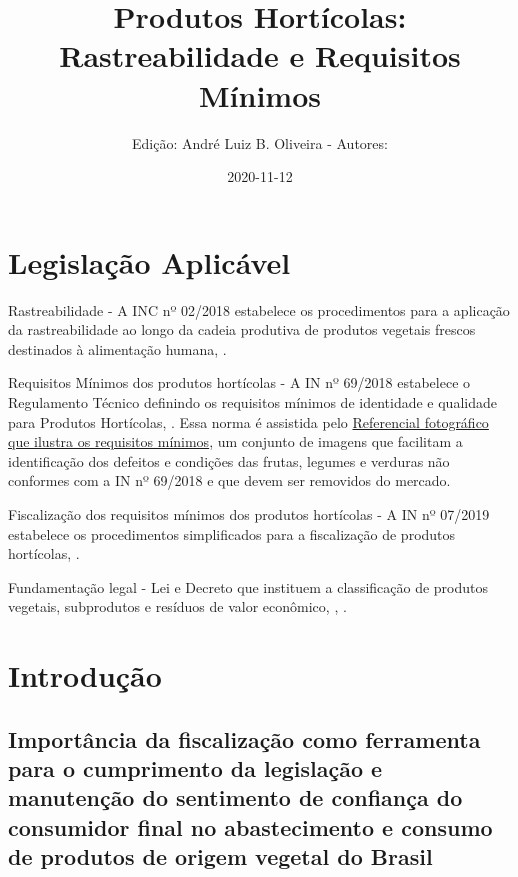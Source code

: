 \documentclass[
]{book}
\title{Produtos Hortícolas: Rastreabilidade e Requisitos Mínimos}
\author{Edição: André Luiz B. Oliveira - Autores:}
\date{2020-11-12}
\begin{document}
\maketitle

{
\setcounter{tocdepth}{1}
\tableofcontents
}
\hypertarget{legislauxe7uxe3o-aplicuxe1vel}{%
\chapter{Legislação Aplicável}\label{legislauxe7uxe3o-aplicuxe1vel}}

Rastreabilidade - A INC nº 02/2018 estabelece os procedimentos para a aplicação da rastreabilidade ao longo da cadeia produtiva de produtos vegetais frescos destinados à alimentação humana, \citep{INC}.

Requisitos Mínimos dos produtos hortícolas - A IN nº 69/2018 estabelece o Regulamento Técnico definindo os requisitos mínimos de identidade e qualidade para Produtos Hortícolas, \citep{REQ}. Essa norma é assistida pelo \href{https://www.gov.br/agricultura/pt-br/assuntos/inspecao/produtos-vegetal/arquivos/referencial-fotografico/referencial-fotografico}{Referencial fotográfico que ilustra os requisitos mínimos}, um conjunto de imagens que facilitam a identificação dos defeitos e condições das frutas, legumes e verduras não conformes com a IN nº 69/2018 e que devem ser removidos do mercado.

Fiscalização dos requisitos mínimos dos produtos hortícolas - A IN nº 07/2019 estabelece os procedimentos simplificados para a fiscalização de produtos hortícolas, \citep{FiscREQ}.

Fundamentação legal - Lei e Decreto que instituem a classificação de produtos vegetais, subprodutos e resíduos de valor econômico, \citep{Lei}, \citep{Decr}.

\hypertarget{intro}{%
\chapter{Introdução}\label{intro}}

\hypertarget{importuxe2ncia-da-fiscalizauxe7uxe3o-como-ferramenta-para-o-cumprimento-da-legislauxe7uxe3o-e-manutenuxe7uxe3o-do-sentimento-de-confianuxe7a-do-consumidor-final-no-abastecimento-e-consumo-de-produtos-de-origem-vegetal-do-brasil}{%
\section{Importância da fiscalização como ferramenta para o cumprimento da legislação e manutenção do sentimento de confiança do consumidor final no abastecimento e consumo de produtos de origem vegetal do Brasil}\label{importuxe2ncia-da-fiscalizauxe7uxe3o-como-ferramenta-para-o-cumprimento-da-legislauxe7uxe3o-e-manutenuxe7uxe3o-do-sentimento-de-confianuxe7a-do-consumidor-final-no-abastecimento-e-consumo-de-produtos-de-origem-vegetal-do-brasil}}
\end{document}

